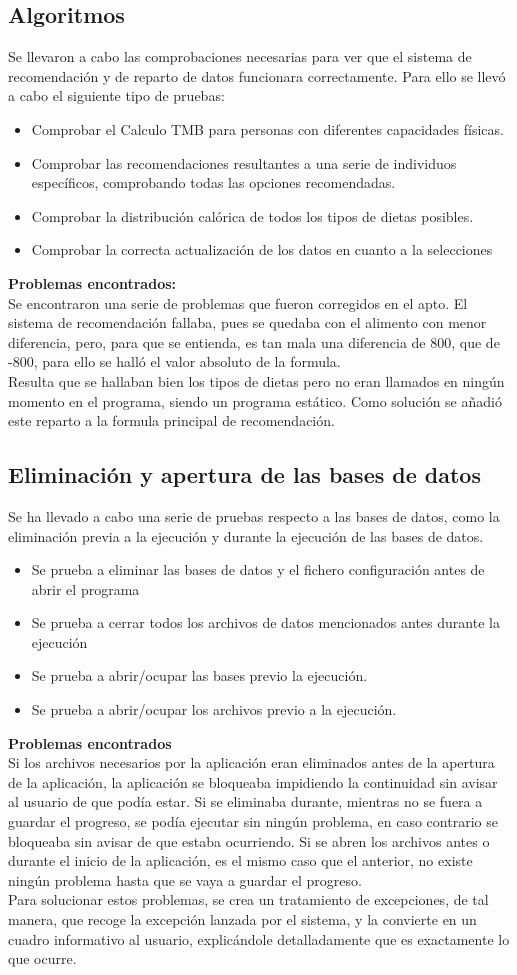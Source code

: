 \subsection{Algoritmos}
Se llevaron a cabo las comprobaciones necesarias para ver que el sistema de recomendación y de reparto de datos funcionara correctamente. Para ello se llevó a cabo el siguiente tipo de pruebas:
\begin{itemize}
\item Comprobar el Calculo TMB para personas con diferentes capacidades físicas.
\item Comprobar las recomendaciones resultantes a una serie de individuos específicos, comprobando todas las opciones recomendadas.
\item Comprobar la distribución calórica de todos los tipos de dietas posibles.
\item Comprobar la correcta actualización de los datos en cuanto a la selecciones
\end{itemize}
\textbf{Problemas encontrados:}\\
Se encontraron una serie de problemas que fueron corregidos en el apto. El sistema de recomendación fallaba, pues se quedaba con el alimento con menor diferencia, pero, para que se entienda, es tan mala una diferencia de 800, que de -800, para ello se halló el valor absoluto de la formula.\\
Resulta que se hallaban bien los tipos de dietas pero no eran llamados en ningún momento en el programa, siendo un programa estático. Como solución se añadió este reparto a la formula principal de recomendación.
\subsection{Eliminación y apertura de las bases de datos}
Se ha llevado a cabo una serie de pruebas respecto a las bases de datos, como la eliminación previa a la ejecución y durante la ejecución de las bases de datos.
\begin{itemize}
\item Se prueba a eliminar las bases de datos y el fichero configuración antes de abrir el programa
\item Se prueba a cerrar todos los archivos de datos mencionados antes durante la ejecución
\item Se prueba a abrir/ocupar las bases previo la ejecución.
\item Se prueba a abrir/ocupar los archivos previo a la ejecución.
\end{itemize}
\textbf{Problemas encontrados}\\
Si los archivos necesarios por la aplicación eran eliminados antes de la apertura de la aplicación, la aplicación se bloqueaba impidiendo la continuidad sin avisar al usuario de que podía estar. Si se eliminaba durante, mientras no se fuera a guardar el progreso, se podía ejecutar sin ningún problema, en caso contrario se bloqueaba sin avisar de que estaba ocurriendo. Si se abren los archivos antes o durante el inicio de la aplicación, es el mismo caso que el anterior, no existe ningún problema hasta que se vaya a guardar el progreso.\\

Para solucionar estos problemas, se crea un tratamiento de excepciones, de tal manera, que recoge la excepción lanzada por el sistema, y la convierte en un cuadro informativo al usuario, explicándole detalladamente que es exactamente lo que ocurre.